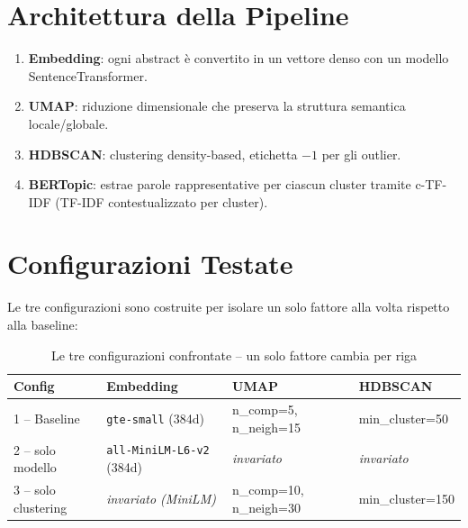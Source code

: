 \documentclass[12pt,a4paper]{article}
\begin{document}
\section{Architettura della Pipeline}

\begin{enumerate}[noitemsep]
  \item \textbf{Embedding}: ogni abstract \`e convertito in un vettore denso con un modello SentenceTransformer.
  \item \textbf{UMAP}: riduzione dimensionale che preserva la struttura semantica locale/globale.
  \item \textbf{HDBSCAN}: clustering density-based, etichetta $-1$ per gli outlier.
  \item \textbf{BERTopic}: estrae parole rappresentative per ciascun cluster tramite c-TF-IDF (TF-IDF contestualizzato per cluster).
\end{enumerate}

\section{Configurazioni Testate}

Le tre configurazioni sono costruite per isolare un solo fattore alla volta rispetto alla baseline:

\begin{table}[H]
  \centering
  \small
  \caption{Le tre configurazioni confrontate -- un solo fattore cambia per riga}
  \begin{tabular}{p{2.6cm}p{3.1cm}p{4.3cm}p{3.6cm}}
    \toprule
    \textbf{Config} & \textbf{Embedding} & \textbf{UMAP} & \textbf{HDBSCAN} \\
    \midrule
    1 -- Baseline        & \texttt{gte-small} (384d)          & n\_comp=5, n\_neigh=15  & min\_cluster=50 \\
    2 -- solo modello     & \texttt{all-MiniLM-L6-v2} (384d)   & \textit{invariato}      & \textit{invariato} \\
    3 -- solo clustering  & \textit{invariato (MiniLM)}        & n\_comp=10, n\_neigh=30 & min\_cluster=150 \\
    \bottomrule
  \end{tabular}
\end{table}
\end{document}
